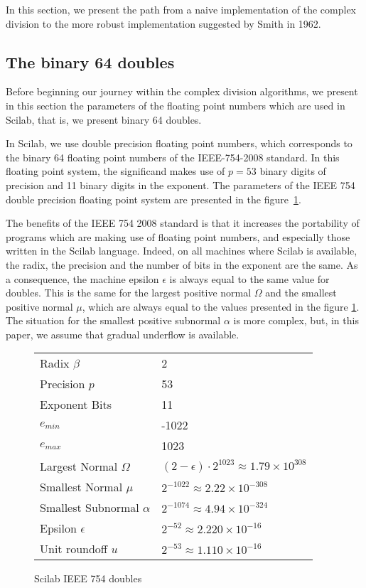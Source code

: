 \documentclass{paper}
\begin{document}
In this section, we present the path from a naive implementation 
of the complex division to the more robust implementation suggested 
by Smith in 1962. 

\subsection{The binary 64 doubles}
Before beginning our journey within the complex division algorithms, 
we present in this section the parameters of the floating point 
numbers which are used in Scilab, that is, we present binary 64 doubles.

In Scilab, we use double precision floating point numbers, which  
corresponds to the binary 64 floating point numbers of the IEEE-754-2008 
\cite{P754:2008:ISF} standard. 
In this floating point system, the significand makes use 
of $p=53$ binary digits of precision and 11 binary digits in the exponent. 
The parameters of the IEEE 754 double precision floating point 
system are presented in the figure~\ref{fig-doubles-properties}.

The benefits of the IEEE 754 2008 standard \cite{P754:2008:ISF} is that it 
increases the portability of programs which are making use of floating point numbers, 
and especially those written in the Scilab language. 
Indeed, on all machines where Scilab is available, the radix, the precision and 
the number of bits in the exponent are the same. 
As a consequence, the machine epsilon $\epsilon$ is always equal 
to the same value for doubles.
This is the same for the largest positive normal $\Omega$ and 
the smallest positive normal $\mu$, which are always 
equal to the values presented in the figure \ref{fig-doubles-properties}.
The situation for the smallest positive subnormal $\alpha$ is more complex, 
but, in this paper, we assume that gradual underflow is available.

\begin{figure}
\caption{Scilab IEEE 754 doubles}
\label{fig-doubles-properties}
\begin{center}
\begin{tabular}{|ll|}
\hline
Radix $\beta$ & 2  \\
Precision $p$ & 53 \\
Exponent Bits & 11 \\
$e_{min}$ & -1022 \\
$e_{max}$ & 1023 \\
Largest Normal $\Omega$ & $\left(2-\epsilon\right)\cdot 2^{1023} \approx 1.79\times 10^{308}$ \\
Smallest Normal $\mu$ & $2^{-1022} \approx 2.22\times 10^{-308}$ \\
Smallest Subnormal $\alpha$ & $2^{-1074} \approx 4.94\times 10^{-324}$ \\
Epsilon $\epsilon$ & $2^{-52} \approx 2.220\times 10^{-16}$ \\
Unit roundoff $u$ & $2^{-53} \approx 1.110\times 10^{-16}$ \\
\hline
\end{tabular}
\end{center}
\end{figure}
\end{document}
